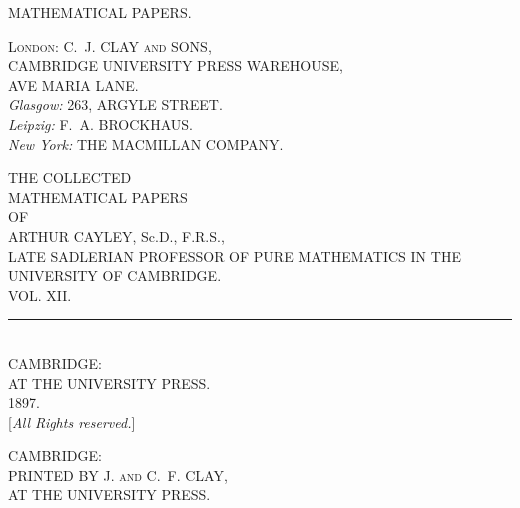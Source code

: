 \documentclass[11pt,a4paper]{article}
\providecommand{\textsc}[1]{{\scshape #1}}
\begin{document}
\thispagestyle{empty}

\begin{center}
\vspace*{\fill}
{\Large MATHEMATICAL PAPERS.}
\vspace*{\fill}
\end{center}
\clearpage

\thispagestyle{empty}
\begin{center}
\vspace*{\fill}
\small
\textsc{London:} C.~J. CLAY \textsc{and} SONS,\\
CAMBRIDGE UNIVERSITY PRESS WAREHOUSE,\\
AVE MARIA LANE.\\
\textit{Glasgow:} 263, ARGYLE STREET.\\[1.5em]
\textit{Leipzig:} F.~A. BROCKHAUS.\\
\textit{New York:} THE MACMILLAN COMPANY.
\vspace*{\fill}
\end{center}
\clearpage

\thispagestyle{empty}
\begin{center}
\vspace*{2em}
{\large THE COLLECTED}\\[1.5em]
{\LARGE MATHEMATICAL PAPERS}\\[2em]
{\normalsize OF}\\[2em]
{\Large ARTHUR CAYLEY, Sc.D., F.R.S.,}\\[0.5em]
{\footnotesize LATE SADLERIAN PROFESSOR OF PURE MATHEMATICS IN THE UNIVERSITY OF CAMBRIDGE.}\\[4em]
{\Large VOL. XII.}\\[5em]
\rule{0.3\textwidth}{0.4pt}\\[1em]
CAMBRIDGE:\\
AT THE UNIVERSITY PRESS.\\
1897.\\[0.5em]
{\small [\textit{All Rights reserved.}]}
\end{center}
\clearpage

\thispagestyle{empty}
\null
\vspace*{\fill}
\begin{center}
{\small CAMBRIDGE:\\
PRINTED BY J. \textsc{and} C.~F. CLAY,\\
AT THE UNIVERSITY PRESS.}
\end{center}
\vspace*{\fill}
\clearpage
\end{document}

